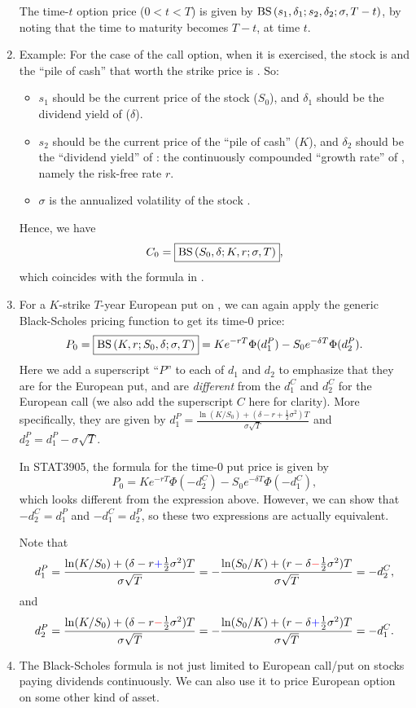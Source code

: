 \begin{enumerate}
\begin{note}
The time-\(t\) option price (\(0<t<T\)) is given by
\(\operatorname{BS}\qty(s_1,\delta_1;s_2,\delta_2;\sigma,T-t)\), by noting that the time to
maturity becomes \(T-t\), at time \(t\).
\end{note}

\item Example: For the case of the call option, when it is exercised, the stock
 is  and the ``pile of cash''
 that worth the strike price is . So:
\begin{itemize}
\item \(s_1\) should be the current price of the stock 
(\(S_0\)), and \(\delta_1\) should be the dividend yield of 
(\(\delta\)).
\item \(s_2\) should be the current price of the ``pile of cash''
 (\(K\)), and \(\delta_2\) should be the ``dividend
yield'' of : the continuously compounded ``growth
rate'' of , namely the risk-free rate \(r\).
\item \(\sigma\) is the annualized volatility of the stock .
\end{itemize}
Hence, we have
\[
C_0=\boxed{\operatorname{BS}\qty(S_0,\delta;K,r;\sigma,T)},
\]
which coincides with the formula in .

\item For a \(K\)-strike \(T\)-year European put on , we can
again apply the generic Black-Scholes pricing function to get its time-0 price:
\[
P_0=\boxed{\operatorname{BS}\qty(K,r;S_0,\delta;\sigma,T)}
=Ke^{-rT}\Phi(d_1^{P})-S_0e^{-\delta T}\Phi(d_2^{P}).
\]
Here we add a superscript ``\(P\)'' to each of \(d_1\) and \(d_2\) to emphasize
that they are for the European put, and are \emph{different} from the \(d_1^C\)
and \(d_2^C\) for the European call \warn{} (we also add the superscript \(C\)
here for clarity). More specifically, they are given by
\(\displaystyle
d_1^{P}=\frac{\ln(K/S_0)+(\delta-r+\frac{1}{2}\sigma^2)T}{\sigma\sqrt{T}}\) and
\(d_2^{P}=d_1^{P}-\sigma\sqrt{T}\).

In STAT3905, the formula for the time-0 put price is given by
\[
P_0=Ke^{-rT}\Phi(-d_2^{C})-S_0e^{-\delta T}\Phi(-d_1^{C}),
\]
which looks different from the expression above. However, we can show that
\(-d_2^C=d_1^P\) and \(-d_1^C=d_2^P\), so these two expressions are actually
equivalent.

\begin{pf}
Note that
\[
d_1^{P}=\frac{\ln(K/S_0)+(\delta-r{\color{blue}+}\frac{1}{2}\sigma^2)T}{\sigma\sqrt{T}}
=-\frac{\ln(S_0/K)+(r-\delta{\color{red}-}\frac{1}{2}\sigma^2)T}{\sigma\sqrt{T}}
=-d_2^C,
\]
and
\[
d_2^{P}=\frac{\ln(K/S_0)+(\delta-r{\color{red}-}\frac{1}{2}\sigma^2)T}{\sigma\sqrt{T}}
=-\frac{\ln(S_0/K)+(r-\delta{\color{blue}+}\frac{1}{2}\sigma^2)T}{\sigma\sqrt{T}}
=-d_1^C.
\]
\end{pf}
\item The Black-Scholes formula is not just limited to European call/put on
stocks paying dividends continuously. We can also use it to price European
option on some other kind of asset.


\end{enumerate}
